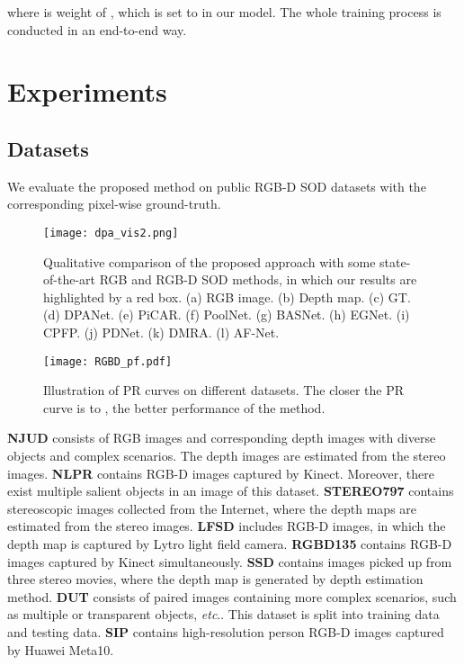 \documentclass[journal]{IEEEtran}
\newcommand{\etc}{\textit{etc}.}
\begin{document}
where  is weight of , which is set to  in our model.
The whole training process is conducted in an end-to-end way.




\section{Experiments}
\subsection{Datasets}
We evaluate the proposed method on  public RGB-D SOD datasets with the corresponding pixel-wise ground-truth.


\begin{figure*}[!t]
	\centering
	\texttt{[image: dpa\_vis2.png]}
	\caption{Qualitative comparison of the proposed approach with some state-of-the-art RGB and RGB-D SOD methods, in which our results are highlighted by a red box. (a) RGB image. (b) Depth map. (c) GT. (d) DPANet. (e) PiCAR. (f) PoolNet. (g) BASNet. (h) EGNet. (i) CPFP. (j) PDNet. (k) DMRA. (l) AF-Net.}
	\label{fig:vis}
\end{figure*}

\begin{figure*}[t]
	\centering
	\texttt{[image: RGBD\_pf.pdf]}
	\caption{Illustration of PR curves on different datasets. The closer the PR curve is to , the better performance of the method.}
	\label{fig:pr}
\end{figure*}

\textbf{NJUD} \cite{ju2014depth} consists of  RGB images and corresponding depth images with diverse objects and complex scenarios. The depth images are estimated from the stereo images.
\textbf{NLPR} \cite{peng2014rgbd} contains  RGB-D images captured by Kinect. Moreover, there exist multiple salient objects in an image of this dataset.
\textbf{STEREO797} \cite{niu2012leveraging} contains  stereoscopic images collected from the Internet, where the depth maps are estimated from the stereo images.
\textbf{LFSD} \cite{li2014saliency} includes  RGB-D images, in which the depth map is captured by Lytro light field camera.
\textbf{RGBD135} \cite{cheng2014depth} contains  RGB-D images captured by Kinect simultaneously.
\textbf{SSD} \cite{zhu2017three} contains  images picked up from three stereo movies, where the depth map is generated by depth estimation method.
\textbf{DUT} \cite{Piao_2019_ICCV} consists of  paired images containing more complex scenarios, such as multiple or transparent objects, \etc.
		This dataset is split into  training data and  testing data.
\textbf{SIP} \cite{fan2019D3Net} contains  high-resolution person RGB-D images captured by Huawei Meta10.
\end{document}
